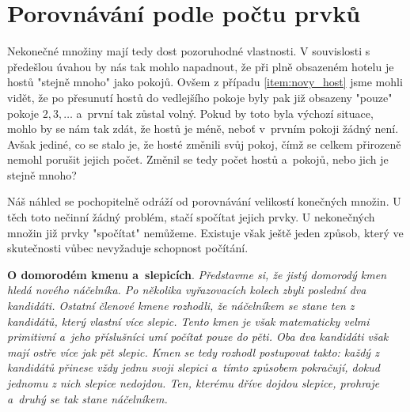 \section{Porovnávání podle počtu prvků}\label{sec:porovnavani_podle_poctu_prvku}
Nekonečné množiny mají tedy dost pozoruhodné vlastnosti. V souvislosti s předešlou úvahou by nás tak mohlo napadnout, že při plně obsazeném hotelu je hostů "stejně mnoho" jako pokojů. Ovšem z případu \ref{item:novy_host} jsme mohli vidět, že po přesunutí hostů do vedlejšího pokoje byly pak již obsazeny "pouze" pokoje $2,3,\dots$ a~první tak zůstal volný. Pokud by toto byla výchozí situace, mohlo by se nám tak zdát, že hostů je méně, neboť v~prvním pokoji žádný není. Avšak jediné, co se stalo je, že hosté změnili svůj pokoj, čímž se celkem přirozeně nemohl porušit jejich počet. Změnil se tedy počet hostů a~pokojů, nebo jich je stejně mnoho?\par
Náš náhled se pochopitelně odráží od porovnávání velikostí konečných množin. U těch toto nečinní žádný problém, stačí spočítat jejich prvky. U nekonečných množin již prvky "spočítat" nemůžeme. Existuje však ještě jeden způsob, který ve skutečnosti vůbec nevyžaduje schopnost počítání.
\medskip

\noindent\textbf{O domorodém kmenu a~slepicích}. \textit{Představme si, že jistý domorodý kmen hledá nového náčelníka. Po několika vyřazovacích kolech zbyli poslední dva kandidáti. Ostatní členové kmene rozhodli, že náčelníkem se stane ten z kandidátů, který vlastní více slepic. Tento kmen je však matematicky velmi primitivní a~jeho příslušníci umí počítat pouze do pěti. Oba dva kandidáti však mají ostře více jak pět slepic. Kmen se tedy rozhodl postupovat takto: každý z kandidátů přinese vždy jednu svoji slepici a~tímto způsobem pokračují, dokud jednomu z nich slepice nedojdou. Ten, kterému dříve dojdou slepice, prohraje a~druhý se tak stane náčelníkem.} \cite{Pick2019}
\medskip

